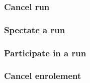 \subsubsection{Cancel run}

\clearpage
\subsubsection{Spectate a run}

\clearpage
\subsubsection{Participate in a run}

\clearpage
\subsubsection{Cancel enrolement}


\clearpage
